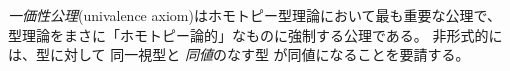 \documentclass[index]{subfiles}
\begin{document}

\emph{一価性公理}(univalence axiom)はホモトピー型理論において最も重要な公理で、
型理論をまさに「ホモトピー論的」なものに強制する公理である。
非形式的には、型に対して
同一視型と
\emph{同値}のなす型
が同値になることを要請する。

\begin{mySubsections}
  
  
  
  
  
  
\end{mySubsections}
\end{document}
